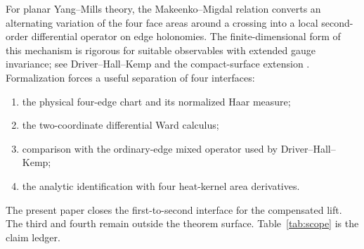 \documentclass[11pt]{article}
\theoremstyle{definition}
\begin{document}
For planar Yang--Mills theory, the Makeenko--Migdal relation converts an
alternating variation of the four face areas around a crossing into a local
second-order differential operator on edge holonomies.  The finite-dimensional
form of this mechanism is rigorous for suitable observables with extended
gauge invariance; see Driver--Hall--Kemp \cite{DHK} and the compact-surface
extension \cite{DGHK}.  Formalization forces a useful separation of four
interfaces:
\begin{enumerate}[leftmargin=1.7em,itemsep=0.2em]
 \item the physical four-edge chart and its normalized Haar measure;
 \item the two-coordinate differential Ward calculus;
 \item comparison with the ordinary-edge mixed operator used by
 Driver--Hall--Kemp;
 \item the analytic identification with four heat-kernel area derivatives.
\end{enumerate}
The present paper closes the first-to-second interface for the compensated
lift.  The third and fourth remain outside the theorem surface.
Table~\ref{tab:scope} is the claim ledger.
\end{document}
